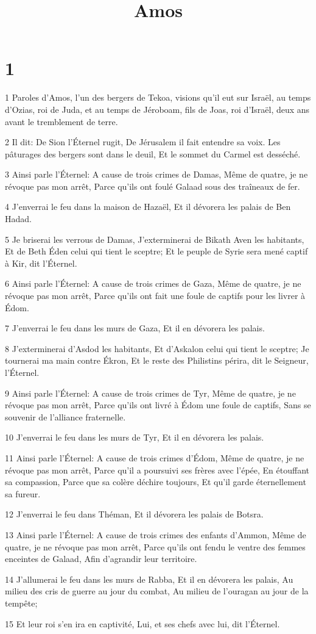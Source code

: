 

\title{Amos}


\chapter{1}

\par 1 Paroles d'Amos, l'un des bergers de Tekoa, visions qu'il eut sur Israël, au temps d'Ozias, roi de Juda, et au temps de Jéroboam, fils de Joas, roi d'Israël, deux ans avant le tremblement de terre.
\par 2 Il dit: De Sion l'Éternel rugit, De Jérusalem il fait entendre sa voix. Les pâturages des bergers sont dans le deuil, Et le sommet du Carmel est desséché.
\par 3 Ainsi parle l'Éternel: A cause de trois crimes de Damas, Même de quatre, je ne révoque pas mon arrêt, Parce qu'ils ont foulé Galaad sous des traîneaux de fer.
\par 4 J'enverrai le feu dans la maison de Hazaël, Et il dévorera les palais de Ben Hadad.
\par 5 Je briserai les verrous de Damas, J'exterminerai de Bikath Aven les habitants, Et de Beth Éden celui qui tient le sceptre; Et le peuple de Syrie sera mené captif à Kir, dit l'Éternel.
\par 6 Ainsi parle l'Éternel: A cause de trois crimes de Gaza, Même de quatre, je ne révoque pas mon arrêt, Parce qu'ils ont fait une foule de captifs pour les livrer à Édom.
\par 7 J'enverrai le feu dans les murs de Gaza, Et il en dévorera les palais.
\par 8 J'exterminerai d'Asdod les habitants, Et d'Askalon celui qui tient le sceptre; Je tournerai ma main contre Ékron, Et le reste des Philistins périra, dit le Seigneur, l'Éternel.
\par 9 Ainsi parle l'Éternel: A cause de trois crimes de Tyr, Même de quatre, je ne révoque pas mon arrêt, Parce qu'ils ont livré à Édom une foule de captifs, Sans se souvenir de l'alliance fraternelle.
\par 10 J'enverrai le feu dans les murs de Tyr, Et il en dévorera les palais.
\par 11 Ainsi parle l'Éternel: A cause de trois crimes d'Édom, Même de quatre, je ne révoque pas mon arrêt, Parce qu'il a poursuivi ses frères avec l'épée, En étouffant sa compassion, Parce que sa colère déchire toujours, Et qu'il garde éternellement sa fureur.
\par 12 J'enverrai le feu dans Théman, Et il dévorera les palais de Botsra.
\par 13 Ainsi parle l'Éternel: A cause de trois crimes des enfants d'Ammon, Même de quatre, je ne révoque pas mon arrêt, Parce qu'ils ont fendu le ventre des femmes enceintes de Galaad, Afin d'agrandir leur territoire.
\par 14 J'allumerai le feu dans les murs de Rabba, Et il en dévorera les palais, Au milieu des cris de guerre au jour du combat, Au milieu de l'ouragan au jour de la tempête;
\par 15 Et leur roi s'en ira en captivité, Lui, et ses chefs avec lui, dit l'Éternel.

